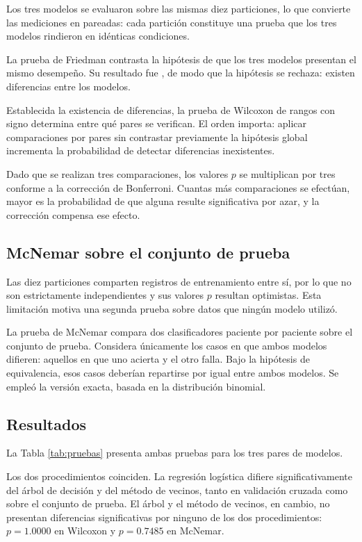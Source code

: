 \documentclass[11pt]{article}
\begin{document}
Los tres modelos se evaluaron sobre las mismas diez particiones, lo que convierte las mediciones
en pareadas: cada partición constituye una prueba que los tres modelos rindieron en idénticas
condiciones.

La prueba de Friedman contrasta la hipótesis de que los tres modelos presentan el mismo
desempeño. Su resultado fue \unskip, de modo que la hipótesis se
rechaza: existen diferencias entre los modelos.

Establecida la existencia de diferencias, la prueba de Wilcoxon de rangos con signo determina
entre qué pares se verifican. El orden importa: aplicar comparaciones por pares sin contrastar
previamente la hipótesis global incrementa la probabilidad de detectar diferencias inexistentes.

Dado que se realizan tres comparaciones, los valores $p$ se multiplican por tres conforme a la
corrección de Bonferroni. Cuantas más comparaciones se efectúan, mayor es la probabilidad de que
alguna resulte significativa por azar, y la corrección compensa ese efecto.

\subsection{McNemar sobre el conjunto de prueba}

Las diez particiones comparten registros de entrenamiento entre sí, por lo que no son
estrictamente independientes y sus valores $p$ resultan optimistas. Esta limitación motiva una
segunda prueba sobre datos que ningún modelo utilizó.

La prueba de McNemar compara dos clasificadores paciente por paciente sobre el conjunto de prueba.
Considera únicamente los casos en que ambos modelos difieren: aquellos en que uno acierta y el
otro falla. Bajo la hipótesis de equivalencia, esos casos deberían repartirse por igual entre
ambos modelos. Se empleó la versión exacta, basada en la distribución binomial.

\subsection{Resultados}

La Tabla \ref{tab:pruebas} presenta ambas pruebas para los tres pares de modelos.



Los dos procedimientos coinciden. La regresión logística difiere significativamente del árbol de
decisión y del método de vecinos, tanto en validación cruzada como sobre el conjunto de prueba.
El árbol y el método de vecinos, en cambio, no presentan diferencias significativas por ninguno de
los dos procedimientos: $p = 1.0000$ en Wilcoxon y $p = 0.7485$ en McNemar.
\end{document}
